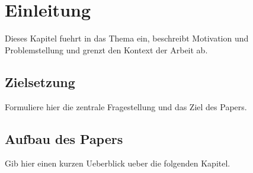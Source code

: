 \section{Einleitung}

Dieses Kapitel fuehrt in das Thema ein, beschreibt Motivation und Problemstellung
und grenzt den Kontext der Arbeit ab.
\cite{knuth1984}

\subsection{Zielsetzung}

Formuliere hier die zentrale Fragestellung und das Ziel des Papers.

\subsection{Aufbau des Papers}

Gib hier einen kurzen Ueberblick ueber die folgenden Kapitel.

